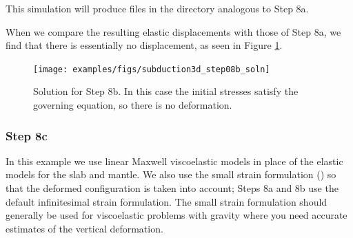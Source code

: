 This simulation will produce files in the  directory
analogous to Step 8a.

When we compare the resulting elastic displacements with those of
Step 8a, we find that there is essentially no displacement,
as seen in Figure \ref{fig:example:subduction:3d:step08b}.

\begin{figure}
  \texttt{[image: examples/figs/subduction3d\_step08b\_soln]}
  \caption{Solution for Step 8b. In this case the initial stresses
    satisfy the governing equation, so there is no deformation.}
  \label{fig:example:subduction:3d:step08b}
\end{figure}

\subsubsection{Step 8c}

In this example we use linear Maxwell viscoelastic models in place of
the elastic models for the slab and mantle. We also use the small
strain formulation () so that the deformed
configuration is taken into account; Steps 8a and 8b use the default
 infinitesimal strain formulation. The small strain
formulation should generally be used for viscoelastic problems with
gravity where you need accurate estimates of the vertical deformation.


